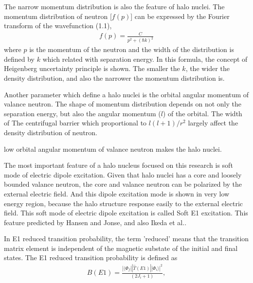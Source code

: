 The narrow momentum distribution is also the feature of halo nuclei. The momentum distribution of neutron [$f (p)$] can be expressed by the Fourier transform of the wavefunction (1.1),
\begin{align}
    f(p) = \frac{C}{p^2+(\hbar k)^2} %
\end{align}
where $p$ is the momentum of the neutron and the width of the distribution is defined by $k$ which related with separation energy. In this formula, the concept of Heigenberg uncertainty principle is shown. The smaller the $k$, the wider the density distribution, and also the narrower the momentum distribution is. 

Another parameter which define a halo nuclei is the orbital angular momentum of valance neutron. The shape of momentum distribution depends on not only the separation energy, but also the angular momentum ($l$) of the orbital. The width of The centrifugal barrier which proportional to $l(l+1)/r^2$ largely affect the density distribution of neutron. 

low orbital angular momentum of valance neutron makes the halo nuclei.

The most important feature of a halo nucleus focused on this research is soft mode of electric dipole excitation. Given that halo nuclei has a core and loosely bounded valance neutron, the core and valance neutron can be polarized by the external electric field. And this dipole excitation mode is shown in very low energy region, because the halo structure response easily to the external electric field. This soft mode of electric dipole excitation is called Soft E1 excitation. This feature predicted by Hansen and Jonse\cite{HansenandJonson}, and also Ikeda et al.\cite{Ikeda}.

In E1 reduced transition probability, the term 'reduced' means that the transition matrix element is independent of the magnetic substate of the initial and final states. The E1 reduced transition probability is defined as
\begin{align}
    B(E1) = \frac{|\langle \Phi_f ||\hat{T}(E1)|| \Phi_i\rangle|^2}{(2J_i + 1)},
\end{align}

